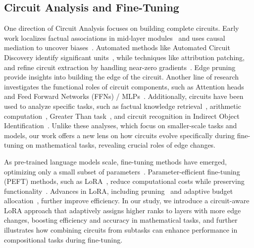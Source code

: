 \subsection{Circuit Analysis and Fine-Tuning}
One direction of Circuit Analysis focuses on building complete circuits. Early work localizes factual associations in mid-layer modules~\cite{NEURIPS2022_6f1d43d5} and uses causal mediation to uncover biases~\cite{vig2020causalmediationanalysisinterpreting,NEURIPS2023_3927bbdc}. Automated methods like Automated Circuit Discovery identify significant units~\cite{NEURIPS2023_34e1dbe9}, while techniques like attribution patching, and refine circuit extraction by handling near-zero gradients~\cite{syed2023attributionpatchingoutperformsautomated,hanna2024faithfaithfulnessgoingcircuit}. Edge pruning~\cite{bhaskar2024findingtransformercircuitsedge} provide insights into building the edge of the circuit. Another line of research investigates the functional roles of circuit components, such as Attention heads~\cite{wu2024retrievalheadmechanisticallyexplains, mcdougall2023copysuppressioncomprehensivelyunderstanding, olsson2022context, gould2023successorheadsrecurringinterpretable, cabannes2024iterationheadmechanisticstudy} and Feed Forward Networks (FFNs) / MLPs~\cite{geva2021transformerfeedforwardlayerskeyvalue, geva2022transformerfeedforwardlayersbuild, bhattacharya2024understandingroleffnsdriving}. 
Additionally, circuits have been used to analyze specific tasks, such as factual knowledge retrieval~\cite{geva2023dissectingrecallfactualassociations}, arithmetic computation~\cite{stolfo2023mechanisticinterpretationarithmeticreasoning}, Greater Than task~\cite{NEURIPS2023_efbba771}, and circuit recognition in Indirect Object Identification~\cite{wang2022interpretabilitywildcircuitindirect}. Unlike these analyses, which focus on smaller-scale tasks and models, our work offers a new lens on how circuits evolve specifically during fine-tuning on mathematical tasks, revealing crucial roles of edge changes.

As pre-trained language models scale, fine-tuning methods have emerged, optimizing only a small subset of parameters~\cite{ding2023parameter}. Parameter-efficient fine-tuning (PEFT) methods, such as LoRA~\cite{hu2021lora}, reduce computational costs while preserving functionality~\cite{ding2023parameter}. Advances in LoRA, including pruning~\cite{zhou2024loradropefficientloraparameter} and adaptive budget allocation~\cite{zhang2023adaloraadaptivebudgetallocation, liu2022few, lialin2024scalingscaleupguide}, further improve efficiency. In our study, we introduce a circuit-aware LoRA approach that adaptively assigns higher ranks to layers with more edge changes, boosting efficiency and accuracy in mathematical tasks, and further illustrates how combining circuits from subtasks can enhance performance in compositional tasks during fine-tuning.